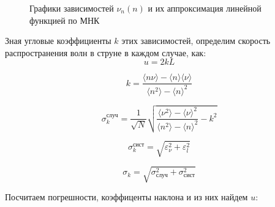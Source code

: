 \documentclass[
a4paper, %
12pt, %
]{article}
\begin{document}
	\begin{figure}[h!]
		\caption{Графики зависимостей $\nu_n(n)$ и их аппроксимация линейной функцией по МНК}
		\label{mnk_graph}
	\end{figure}
	
	\newpage
	
	Зная угловые коэффициенты $k$ этих зависимостей, определим скорость распространения волн в струне в каждом случае, как:
	\[u = 2kL \]
	
	\begin{equation}
		k=\frac{\langle n\nu\rangle-\langle n\rangle \langle \nu\rangle}{\langle n^2\rangle - \langle n\rangle^2}
	\end{equation}
	
	\begin{equation}
		\sigma_k^\text{случ}=\frac{1}{\sqrt{N}}\sqrt{\frac{\langle \nu^2 \rangle - \langle \nu \rangle^2}{\langle n^2 \rangle - \langle n \rangle^2} - k^2  }
	\end{equation}
	
	\begin{equation}
		\sigma_k^{\text{сист}} = \sqrt{ \varepsilon_\nu^2 + \varepsilon_l^2 }
	\end{equation}
	
	\begin{equation}
		\sigma_k = \sqrt{\sigma_\text{случ}^2 + \sigma_\text{сист}^2}
	\end{equation}
	
	Посчитаем погрешности, коэффиценты наклона и из них найдем $u$:
	
\end{document}
